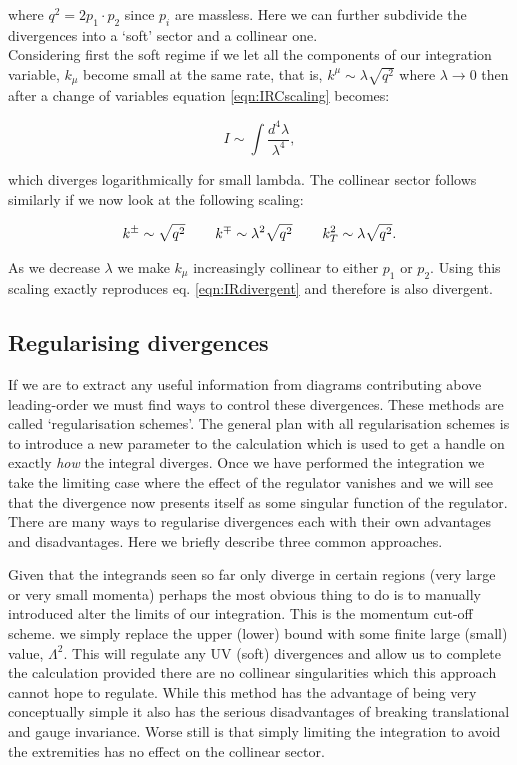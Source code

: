 		where $q^2=2p_1\cdot p_2$ since $p_i$ are massless.  Here we can further subdivide the divergences
		into a `soft' sector and a collinear one.\\Considering first the soft regime if we
		let all the components of our integration variable, $k_\mu$ become small at the same rate, that is,
		$k^\mu\sim\lambda\sqrt{q^2}$ where $\lambda\rightarrow0$ then after a change of variables equation
		\eqref{eqn:IRCscaling} becomes:

		\begin{equation}
			I \sim\int\frac{d^4\lambda}{\lambda^4},
			\label{eqn:IRdivergent}
		\end{equation}

		which diverges logarithmically for small lambda.  The collinear sector follows similarly if we now
		look at the following scaling:

		\begin{align}
			k^\pm\sim\sqrt{q^2}\hspace{0.75cm}k^\mp\sim\lambda^2\sqrt{q^2}\hspace{0.75cm}k_T^2\sim\lambda\sqrt{q^2}.
		\end{align}

		As we decrease $\lambda$ we make $k_\mu$ increasingly collinear to either $p_1$ or $p_2$.  Using
		this scaling exactly reproduces eq. \eqref{eqn:IRdivergent} and therefore is also divergent.

	\subsection{Regularising divergences}
		\label{sub:regularising}


		If we are to extract any useful information from diagrams contributing above leading-order we must find
		ways to control these divergences.  These methods are called `regularisation schemes'.  The
		general plan with all regularisation schemes is to introduce a new parameter to the calculation which
		is used to get a handle on exactly \emph{how} the integral diverges.  Once we have performed the integration
		we take the limiting case where the effect of the regulator vanishes and we will see that the divergence now
		presents itself as some singular function of the regulator.  There are
		many ways to regularise divergences each with their own advantages and disadvantages.  Here we briefly describe
		three common approaches.

		Given that the integrands seen so far only diverge in certain regions (very large or very small momenta)
		perhaps the most obvious thing to do is to manually introduced alter the limits of our integration. This
		is the momentum cut-off scheme. we simply replace the upper (lower) bound with some finite large (small)
		value, $\Lambda^2$.  This will regulate any UV (soft) divergences and allow us to complete the calculation
		provided there are no collinear singularities which this approach cannot hope to regulate.  While this
		method has the advantage of being very conceptually simple it also has the serious disadvantages of
		breaking translational and gauge invariance.  Worse still is that simply limiting the integration to
		avoid the extremities has no effect on the collinear sector.

